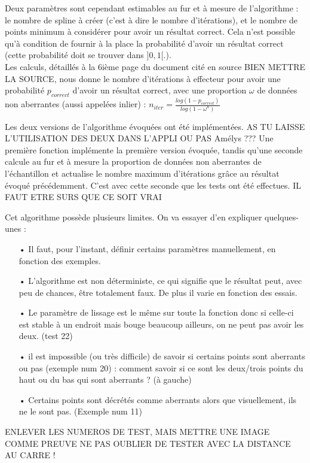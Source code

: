 \documentclass[a4paper,12pt]{article} %
\begin{document}
                    Deux paramètres sont cependant estimables au fur et à mesure de l'algorithme :\\ le nombre de spline à créer (c'est à dire le nombre d'itérations), et le nombre de points minimum à considérer pour avoir un résultat correct. Cela n'est possible qu'à condition de fournir à la place la probabilité d'avoir un résultat correct (cette probabilité doit se trouver dans $]0,1[$.). \\
                    Les calculs, détaillés à la 6ième page du document cité en source BIEN METTRE LA SOURCE, nous donne le nombre d'itérations à effecteur pour avoir une probabilité $p_{correct}$ d'avoir un résultat correct, avec une proportion $\omega$ de données non aberrantes (aussi appelées inlier) : $n_{iter} = \frac{log(1 - p_{correct})}{log(1 - \omega^n)}$
                    
                    Les deux versions de l'algorithme évoquées ont été implémentées. AS TU LAISSE L'UTILISATION DES DEUX DANS L'APPLI OU PAS Amélys ???
                    Une première fonction implémente la première version évoquée, tandis qu'une seconde calcule au fur et à mesure la proportion de données non aberrantes de l'échantillon et actualise le nombre maximum d'itérations grâce au résultat évoqué précédemment.
                    C'est avec cette seconde que les tests ont été effectues. IL FAUT ETRE SURS QUE CE SOIT VRAI
                    
                    Cet algorithme possède plusieurs limites. On va essayer d'en expliquer quelques-unes :
                    \begin{itemize}
                    \item[•] Il faut, pour l'instant, définir certains paramètres manuellement, en fonction des exemples.
                    \item[•] L'algorithme est non déterministe, ce qui signifie que le résultat peut, avec peu de chances, être totalement faux. De plus il varie en fonction des essais.
                    \item[•] Le paramètre de lissage est le même sur toute la fonction donc si celle-ci est stable à un endroit mais bouge beaucoup ailleurs, on ne peut pas avoir les deux. (test 22)
                    \item[•] il est impossible (ou très difficile) de savoir si certains points sont aberrants ou pas (exemple num 20) : comment savoir si ce sont les deux/trois points du haut ou du bas qui sont aberrants ? (à gauche)
                    \item[•] Certains points sont décrétés comme aberrants alors que visuellement, ils ne le sont pas. (Exemple num 11)\\
                    \end{itemize}
                    ENLEVER LES NUMEROS DE TEST, MAIS METTRE UNE IMAGE COMME PREUVE
                   NE PAS OUBLIER DE TESTER AVEC LA DISTANCE AU CARRE !
                    
\end{document}
